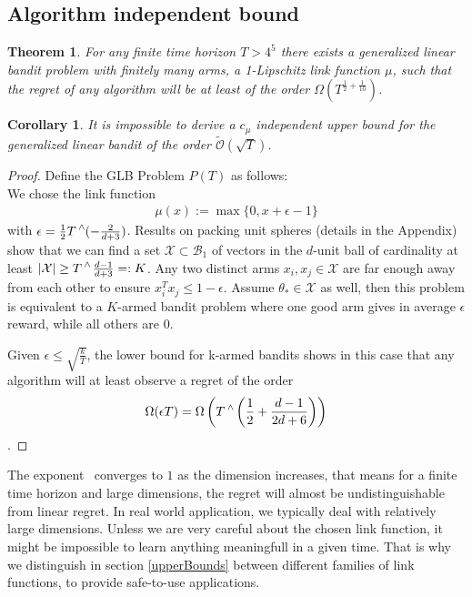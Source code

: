 \documentclass[twoside]{article} \usepackage{aistats2017}
\DeclareMathOperator\caret{\raisebox{1ex}{$\scriptstyle\wedge$}}
\newtheorem{theorem}{Theorem}
\newtheorem{corollary}{Corollary}[theorem]
\begin{document}
\subsection{Algorithm independent bound}
\begin{theorem}
For any finite time horizon $T>4^5$ there exists a generalized linear bandit problem with finitely many arms, a 1-Lipschitz link function $\mu$, such that the regret of any algorithm will be at least of the order $\Omega(T^{\frac{1}{2}+\frac{1}{10}})$.
\end{theorem}
\begin{corollary}
It is impossible to derive a $c_\mu$ independent upper bound for the generalized linear bandit of the order $\tilde{\mathcal{O}}(\sqrt{T})$.
\end{corollary}
\begin{proof}
    Define the GLB Problem $P(T)$ as follows:\\
    We chose the link function 
    \begin{align}
        \mu(x) := \max\{0, x+\epsilon-1\}
    \end{align}
    with $\epsilon = \frac{1}{2}T\caret(-\frac{2}{d+3})$.
    Results on packing unit spheres (details in the Appendix) show that we can find a set $\mathcal{X} \subset \mathcal{B}_1$ of vectors in the $d$-unit ball of cardinality at least $|\mathcal{X}|\geq T\caret{\frac{d-1}{d+3}}=:K$. Any two distinct arms $x_i,x_j\in\mathcal{X}$ are far enough away from each other to ensure $x_i^Tx_j \leq 1-\epsilon$.
    Assume $\theta_*\in \mathcal{X}$ as well, then this problem is equivalent to a $K$-armed bandit problem where one good arm gives in average $\epsilon$ reward, while all others are 0.
    
     Given $\epsilon\leq\sqrt{\frac{k}{T}}$, the lower bound for k-armed bandits shows in this case that any algorithm will at least observe a regret of the order 
     $$\Omega(\epsilon T) = \Omega\left(T\caret\left(\frac{1}{2}+\frac{d-1}{2d+6}\right)\right)$$.
\end{proof}
The exponent $\frac{}{}$ converges to $1$ as the dimension increases, that means for a finite time horizon and large dimensions, the regret will almost be undistinguishable from linear regret. 
In real world application, we typically deal with relatively large dimensions. 
Unless we are very careful about the chosen link function, it might be impossible to learn anything meaningfull in a given time.
That is why we distinguish in section \ref{upperBounds} between different families of link functions, to provide safe-to-use applications.
\end{document}
